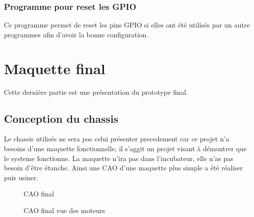 \documentclass[a4paper, 11pt]{article}
\begin{document}
\subsubsection{Programme pour reset les GPIO}
Ce programme permet de reset les pins GPIO si elles ont été utilisés par un autre programmes afin d'avoir la bonne configuration.
\newpage
\section{Maquette final}
Cette dernière partie est une présentation du prototype final.
\subsection{Conception du chassis}
Le chassis utilisés ne sera pas celui présenter precedement car ce projet n'a besoins
d'une maquette fonctionnelle, il s'aggit un projet visant à démontrer que
le systeme fonctionne. La maquette n'ira pas dans l'incubateur, elle n'as pas
besoin d'être étanche.
Ainsi une CAO d'une maquette plus simple a été réaliser puis usiner.
\begin{multicols}{2}
    \begin{figure}[H]
        \centering
        \caption{CAO final}
        \label{fig:CAO_final}
    \end{figure}
    \begin{figure}[H]
        \centering
        \caption{CAO final vue des moteurs}
        \label{fig:CAO_final_dos}
    \end{figure}
\end{multicols}
\end{document}
